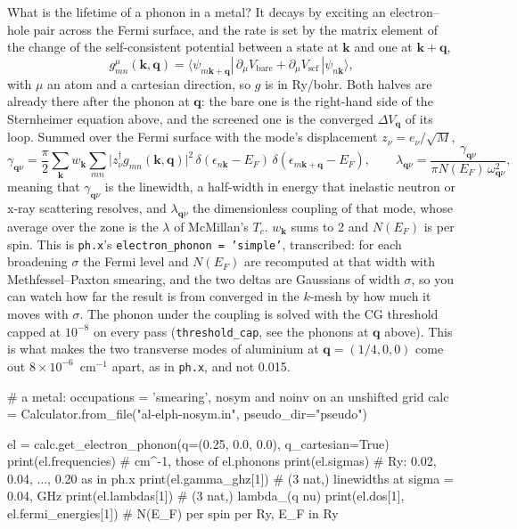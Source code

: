 \documentclass[11pt,a4paper]{article}
\newcommand{\code}[1]{\texttt{\small #1}}
\begin{document}
What is the lifetime of a phonon in a metal? It decays by exciting an
electron--hole pair across the Fermi surface, and the rate is set by the matrix
element of the change of the self-consistent potential between a state at
$\mathbf k$ and one at $\mathbf k+\mathbf q$,
\begin{equation*}
g^{\mu}_{mn}(\mathbf k,\mathbf q) = \langle\psi_{m\mathbf k+\mathbf q}|
  \,\partial_{\mu}V_{\mathrm{bare}} + \partial_{\mu}V_{\mathrm{scf}}\,|\psi_{n\mathbf k}\rangle ,
\end{equation*}
with $\mu$ an atom and a cartesian direction, so $g$ is in Ry/bohr. Both
halves are already there after the phonon at $\mathbf q$: the bare one is the
right-hand side of the Sternheimer equation above, and the screened one is the
converged $\Delta V_{\mathbf q}$ of its loop. Summed over the Fermi surface
with the mode's displacement $z_\nu = e_\nu/\sqrt M$,
\begin{equation*}
\gamma_{\mathbf q\nu} = \frac{\pi}{2}\sum_{\mathbf k}w_{\mathbf k}\sum_{mn}
  \big|z_\nu^{\dagger} g_{mn}(\mathbf k,\mathbf q)\big|^2\,
  \delta(\epsilon_{n\mathbf k}-E_F)\,\delta(\epsilon_{m\mathbf k+\mathbf q}-E_F),
\qquad
\lambda_{\mathbf q\nu} = \frac{\gamma_{\mathbf q\nu}}{\pi N(E_F)\,\omega_{\mathbf q\nu}^2},
\end{equation*}
meaning that $\gamma_{\mathbf q\nu}$ is the linewidth, a half-width in
energy that inelastic neutron or x-ray scattering resolves, and
$\lambda_{\mathbf q\nu}$ the dimensionless coupling of that mode, whose
average over the zone is the $\lambda$ of McMillan's $T_c$. $w_{\mathbf k}$
sums to 2 and $N(E_F)$ is per spin. This is \code{ph.x}'s
\code{electron\_phonon = 'simple'}, transcribed: for each broadening
$\sigma$ the Fermi level and $N(E_F)$ are recomputed at that width with
Methfessel--Paxton smearing, and the two deltas are Gaussians of width
$\sigma$, so you can watch how far the result is from converged in the
$k$-mesh by how much it moves with $\sigma$. The phonon under the coupling is
solved with the CG threshold capped at $10^{-8}$ on every pass
(\code{threshold\_cap}, see the phonons at $\mathbf q$ above). This is what
makes the two transverse modes of aluminium at $\mathbf q = (1/4, 0, 0)$ come
out $8\times10^{-6}$~cm$^{-1}$ apart, as in \code{ph.x}, and not 0.015.

\begin{pycode}
# a metal: occupations = 'smearing', nosym and noinv on an unshifted grid
calc = Calculator.from_file("al-elph-nosym.in", pseudo_dir="pseudo")

el = calc.get_electron_phonon(q=(0.25, 0.0, 0.0), q_cartesian=True)
print(el.frequencies)        # cm^-1, those of el.phonons
print(el.sigmas)             # Ry: 0.02, 0.04, ..., 0.20 as in ph.x
print(el.gamma_ghz[1])       # (3 nat,) linewidths at sigma = 0.04, GHz
print(el.lambdas[1])         # (3 nat,) lambda_(q nu)
print(el.dos[1], el.fermi_energies[1])   # N(E_F) per spin per Ry, E_F in Ry
\end{pycode}
\end{document}
